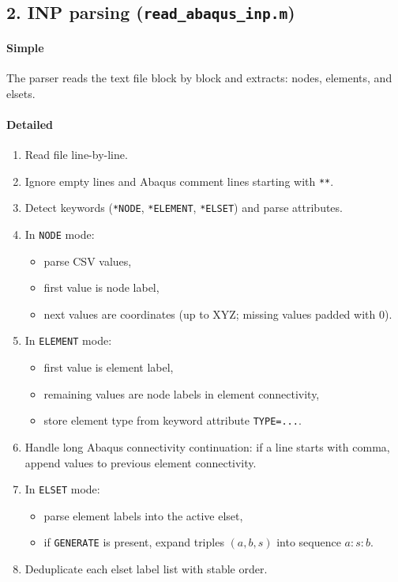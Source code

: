 \documentclass[11pt]{article}
\begin{document}
\subsection*{2. INP parsing (\texttt{read\_abaqus\_inp.m})}
\paragraph{Simple}
The parser reads the text file block by block and extracts:
nodes, elements, and elsets.

\paragraph{Detailed}
\begin{enumerate}
  \item Read file line-by-line.
  \item Ignore empty lines and Abaqus comment lines starting with \texttt{**}.
  \item Detect keywords (\texttt{*NODE}, \texttt{*ELEMENT}, \texttt{*ELSET}) and parse attributes.
  \item In \texttt{NODE} mode:
  \begin{itemize}
    \item parse CSV values,
    \item first value is node label,
    \item next values are coordinates (up to XYZ; missing values padded with 0).
  \end{itemize}
  \item In \texttt{ELEMENT} mode:
  \begin{itemize}
    \item first value is element label,
    \item remaining values are node labels in element connectivity,
    \item store element type from keyword attribute \texttt{TYPE=...}.
  \end{itemize}
  \item Handle long Abaqus connectivity continuation:
  if a line starts with comma, append values to previous element connectivity.
  \item In \texttt{ELSET} mode:
  \begin{itemize}
    \item parse element labels into the active elset,
    \item if \texttt{GENERATE} is present, expand triples \((a,b,s)\) into sequence \(a:s:b\).
  \end{itemize}
  \item Deduplicate each elset label list with stable order.
\end{enumerate}
\end{document}
